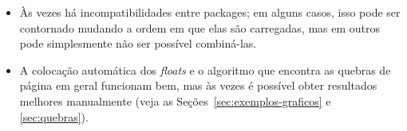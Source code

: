 \begin{itemize}
    \item Às vezes há incompatibilidades entre packages; em alguns casos,
    isso pode ser contornado mudando a ordem em que elas são carregadas,
    mas em outros pode simplesmente não ser possível combiná-las.

    \item A colocação automática dos \emph{floats} e o algoritmo
    que encontra as quebras de página em geral funcionam bem, mas às
    vezes é possível obter resultados melhores manualmente (veja as
    Seções~\ref{sec:exemplos-graficos} e \ref{sec:quebras}).



\end{itemize}
